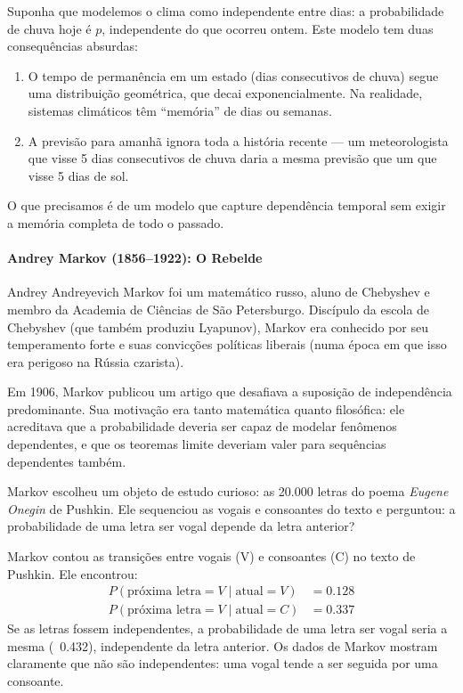\documentclass{tufte-handout}
\begin{document}
\begin{exmp}
    Suponha que modelemos o clima como independente entre dias: a probabilidade de chuva
    hoje é $p$, independente do que ocorreu ontem. Este modelo tem duas consequências absurdas:
    \begin{enumerate}
        \item O tempo de permanência em um estado (dias consecutivos de chuva) segue uma
        distribuição geométrica, que decai exponencialmente. Na realidade, sistemas climáticos
        têm ``memória'' de dias ou semanas.
        \item A previsão para amanhã ignora toda a história recente --- um meteorologista
        que visse 5 dias consecutivos de chuva daria a mesma previsão que um que visse 5 dias
        de sol.
    \end{enumerate}
\end{exmp}

O que precisamos é de um modelo que capture dependência temporal sem exigir a memória
completa de todo o passado.

\paragraph{Andrey Markov (1856--1922): O Rebelde}

Andrey Andreyevich Markov foi um matemático russo, aluno de Chebyshev e membro da
Academia de Ciências de São Petersburgo. Discípulo da escola de Chebyshev (que também
produziu Lyapunov), Markov era conhecido por seu temperamento forte e suas convicções
políticas liberais (numa época em que isso era perigoso na Rússia czarista).

Em 1906, Markov publicou um artigo que desafiava a suposição de independência predominante.
Sua motivação era tanto matemática quanto filosófica: ele acreditava que a probabilidade
deveria ser capaz de modelar fenômenos dependentes, e que os teoremas limite deveriam
valer para sequências dependentes também.

Markov escolheu um objeto de estudo curioso: as 20.000 letras do poema \textit{Eugene Onegin}
de Pushkin. Ele sequenciou as vogais e consoantes do texto e perguntou: a probabilidade de
uma letra ser vogal depende da letra anterior?

\begin{exmp}
    Markov contou as transições entre vogais (V) e consoantes (C) no texto de Pushkin.
    Ele encontrou:
    \begin{align*}
        P(\text{próxima letra} = V \mid \text{atual} = V) &= 0.128 \\
        P(\text{próxima letra} = V \mid \text{atual} = C) &= 0.337
    \end{align*}
    Se as letras fossem independentes, a probabilidade de uma letra ser vogal seria a mesma
    (~0.432), independente da letra anterior. Os dados de Markov mostram claramente que
    não são independentes: uma vogal tende a ser seguida por uma consoante.
\end{exmp}
\end{document}
